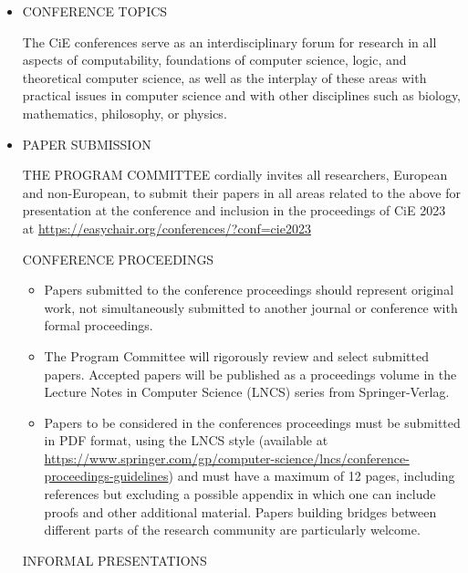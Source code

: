 \documentclass[prodmode,acmtecs]{acmsmall} %
\begin{document}
\begin{itemize}
\item  CONFERENCE TOPICS 
 
  The CiE conferences serve as an interdisciplinary forum for research in all aspects of computability, foundations of computer science, logic, and theoretical computer science, as well as the interplay of these areas with practical issues in computer science and with other disciplines such as biology, mathematics, philosophy, or physics. 
 
\item  PAPER SUBMISSION 
 
  THE PROGRAM COMMITTEE cordially invites all researchers, European and non-European, to submit their papers in all areas related to the above for presentation at the conference and inclusion in the proceedings of CiE 2023 at \href{https://easychair.org/conferences/?conf=cie2023}{https://easychair.org/conferences/?conf=cie2023} 
 
  CONFERENCE PROCEEDINGS   
 
\begin{itemize}\item  Papers submitted to the conference proceedings should represent original work, not simultaneously submitted to another journal or conference with formal proceedings.
\item  The Program Committee will rigorously review and select submitted papers. Accepted papers will be published as a proceedings volume in the Lecture Notes in Computer Science (LNCS) series from Springer-Verlag.
\item  Papers to be considered in the conferences proceedings must be submitted in PDF format, using the LNCS style (available at \href{https://www.springer.com/gp/computer-science/lncs/conference-proceedings-guidelines}{https://www.springer.com/gp/computer-science/lncs/conference-proceedings-guidelines}) and must have a maximum of 12 pages, including references but excluding a possible appendix in which one can include proofs and other additional material. Papers building bridges between different parts of the research community are particularly welcome.
\end{itemize} 
  INFORMAL PRESENTATIONS 
 

\end{itemize}
\end{document}
